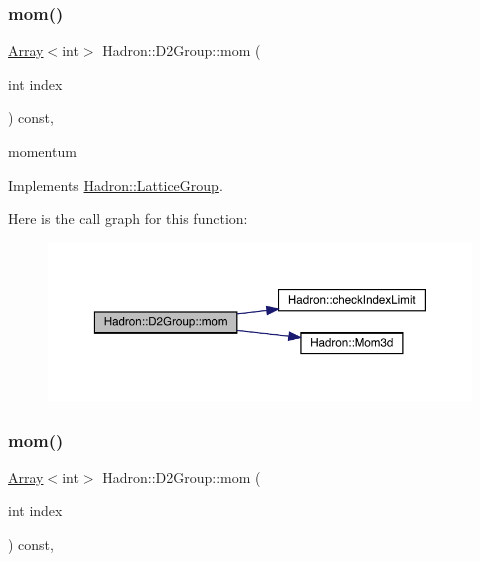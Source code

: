 \subsubsection{\texorpdfstring{mom()}{mom()}\hspace{0.1cm}{\footnotesize\ttfamily [1/3]}}
{\footnotesize\ttfamily \mbox{\hyperlink{classXMLArray_1_1Array}{Array}}$<$int$>$ Hadron\+::\+D2\+Group\+::mom (\begin{DoxyParamCaption}\item[{int}]{index }\end{DoxyParamCaption}) const\hspace{0.3cm}{\ttfamily [inline]}, {\ttfamily [virtual]}}

momentum 

Implements \mbox{\hyperlink{structHadron_1_1LatticeGroup_ad577b65041dd9a6e84b1f3bd49cb8fce}{Hadron\+::\+Lattice\+Group}}.

Here is the call graph for this function\+:
\nopagebreak
\begin{figure}[H]
\begin{center}
\leavevmode
\includegraphics[width=350pt]{d8/de7/structHadron_1_1D2Group_a65d28ef1fef635e870d60b6606b65f19_cgraph}
\end{center}
\end{figure}
\mbox{\label{structHadron_1_1D2Group_a65d28ef1fef635e870d60b6606b65f19}} 
\subsubsection{\texorpdfstring{mom()}{mom()}\hspace{0.1cm}{\footnotesize\ttfamily [2/3]}}
{\footnotesize\ttfamily \mbox{\hyperlink{classXMLArray_1_1Array}{Array}}$<$int$>$ Hadron\+::\+D2\+Group\+::mom (\begin{DoxyParamCaption}\item[{int}]{index }\end{DoxyParamCaption}) const\hspace{0.3cm}{\ttfamily [inline]}, {\ttfamily [virtual]}}

